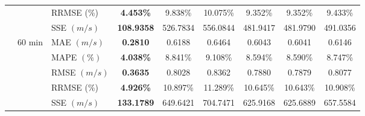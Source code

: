 {\begin{longtable}{lllcccccc}
& {} & {RRMSE {(\%)}} & {\textbf{4.453\%}} & {9.838\%} & {10.075\%} & {9.352\%} & {9.352\%} & {9.433\%} \\
& {} & {SSE {$(m/s)$}} & {\textbf{108.9358}} & {526.7834} & {556.0844} & {481.9417} & {481.9790} & {491.0356} \\
& 60 min & MAE {$(m/s)$} & \textbf{0.2810} & 0.6188 & 0.6464 & 0.6043 & 0.6041 & 0.6146 \\
&  & MAPE {$(\%)$} & \textbf{4.038\%} & 8.841\% & 9.108\% & 8.594\% & 8.590\% & 8.747\% \\
&  & RMSE {$(m/s)$} & \textbf{0.3635} & 0.8028 & 0.8362 & 0.7880 & 0.7879 & 0.8077 \\
& {} & {RRMSE {(\%)}} & {\textbf{4.926\%}} & {10.897\%} & {11.289\%} & {10.645\%} & {10.643\%} & {10.908\%} \\
& {} & {SSE {$(m/s)$}} & {\textbf{133.1789}} & {649.6421} & {704.7471} & {625.9168} & {625.6889} & {657.5584} \\ \hline
\end{longtable}
}